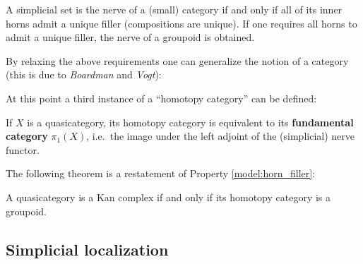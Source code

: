     \begin{property}\label{model:horn_filler}
        A simplicial set is the nerve of a (small) category if and only if all of its inner horns admit a unique filler (compositions are unique). If one requires all horns to admit a unique filler, the nerve of a groupoid is obtained.
    \end{property}

    By relaxing the above requirements one can generalize the notion of a category (this is due to \textit{Boardman} and \textit{Vogt}):

    At this point a third instance of a ``homotopy category'' can be defined:
    \begin{property}
        If $X$ is a quasicategory, its homotopy category is equivalent to its \textbf{fundamental category} $\pi_1(X)$, i.e.~the image under the left adjoint of the (simplicial) nerve functor.
    \end{property}

    The following theorem is a restatement of Property \ref{model:horn_filler}:
    \begin{theorem}[Joyal]
        A quasicategory is a Kan complex if and only if its homotopy category is a groupoid.
    \end{theorem}

\subsection{Simplicial localization}

